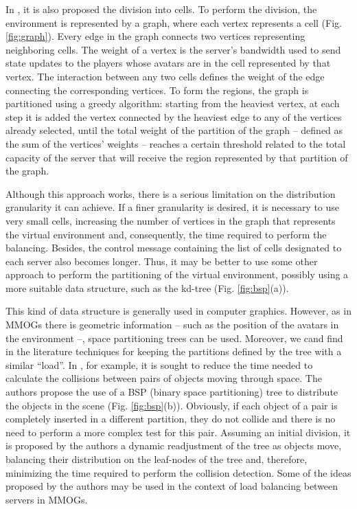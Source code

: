 \documentclass[acmjacm]{acmtrans2m}
\newcommand{\figurecaption}{Fig.}
\begin{document}
In \cite{bezerra2009lbs}, it is also proposed the division into cells. To perform the division, the environment is represented by a graph, where each vertex represents a cell (\figurecaption{} \ref{fig:graph}). Every edge in the graph connects two vertices representing neighboring cells. The weight of a vertex is the server's bandwidth used to send state updates to the players whose avatars are in the cell represented by that vertex. The interaction between any two cells defines the weight of the edge connecting the corresponding vertices. To form the regions, the graph is partitioned using a greedy algorithm: starting from the heaviest vertex, at each step it is added the vertex connected by the heaviest edge to any of the vertices already selected, until the total weight of the partition of the graph -- defined as the sum of the vertices' weights -- reaches a certain threshold related to the total capacity of the server that will receive the region represented by that partition of the graph.

Although this approach works, there is a serious limitation on the distribution granularity it can achieve. If a finer granularity is desired, it is necessary to use very small cells, increasing the number of vertices in the graph that represents the virtual environment and, consequently, the time required to perform the balancing. Besides, the control message containing the list of cells designated to each server also becomes longer. Thus, it may be better to use some other approach to perform the partitioning of the virtual environment, possibly using a more suitable data structure, such as the kd-tree \cite{bentley1975mbs} (\figurecaption{} \ref{fig:bsp}(a)).

This kind of data structure is generally used in computer graphics. However, as in MMOGs there is geometric information -- such as the position of the avatars in the environment --, space partitioning trees can be used. Moreover, we cand find in the literature techniques for keeping the partitions defined by the tree with a similar ``load''. In \cite{luque2005bpc}, for example, it is sought to reduce the time needed to calculate the collisions between pairs of objects moving through space. The authors propose the use of a BSP (binary space partitioning) tree to distribute the objects in the scene (\figurecaption{} \ref{fig:bsp}(b)). Obviously, if each object of a pair is completely inserted in a different partition, they do not collide and there is no need to perform a more complex test for this pair. Assuming an initial division, it is proposed by the authors a dynamic readjustment of the tree as objects move, balancing their distribution on the leaf-nodes of the tree and, therefore, minimizing the time required to perform the collision detection. Some of the ideas proposed by the authors may be used in the context of load balancing between servers in MMOGs.
\end{document}

